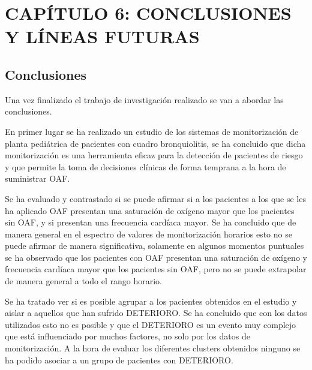 \section{CAPÍTULO 6: CONCLUSIONES Y LÍNEAS FUTURAS}\label{cap:conclusionesANDlineasfuturas}

\subsection{Conclusiones}\label{sec:conclusiones}

Una vez finalizado el trabajo de investigación realizado se van a abordar las conclusiones. 

En primer lugar se ha realizado un estudio de los sistemas de monitorización de planta pediátrica de pacientes con cuadro bronquiolitis, se ha concluido que dicha monitorización es una herramienta eficaz para la detección de pacientes de riesgo y que permite la toma de decisiones clínicas de forma temprana a la hora de suministrar OAF.

Se ha evaluado y contrastado si se puede afirmar si a los pacientes a los que se les ha aplicado OAF presentan una saturación de oxígeno mayor que los pacientes sin OAF, y si presentan una frecuencia cardíaca mayor. Se ha concluido que de manera general en el espectro de valores de monitorización horarios esto no se puede afirmar de manera significativa, solamente en algunos momentos puntuales se ha observado que los pacientes con OAF presentan una saturación de oxígeno y frecuencia cardíaca mayor que los pacientes sin OAF, pero no se puede extrapolar de manera general a todo el rango horario. 

Se ha tratado ver si es posible agrupar a los pacientes obtenidos en el estudio y aislar a aquellos que han sufrido DETERIORO. Se ha concluido que con los datos utilizados esto no es posible y que el DETERIORO es un evento muy complejo que está influenciado por muchos factores, no solo por los datos de monitorización. A la hora de evaluar los diferentes clusters obtenidos ninguno se ha podido asociar a un grupo de pacientes con DETERIORO.

